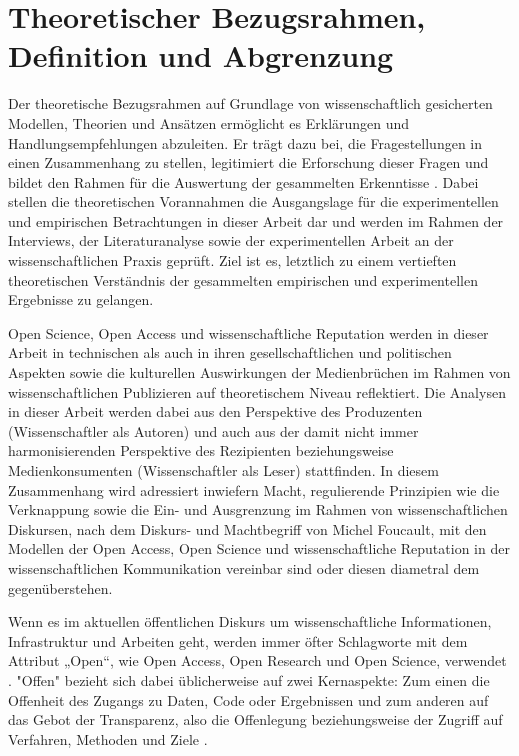 \chapter{Theoretischer Bezugsrahmen, Definition und Abgrenzung } 

Der theoretische Bezugsrahmen auf Grundlage von wissenschaftlich gesicherten Modellen, Theorien und Ansätzen ermöglicht es Erklärungen und Handlungsempfehlungen abzuleiten\cite{martin_2007_wissenschaftstheorie}. Er trägt dazu bei, die Fragestellungen in einen Zusammenhang zu stellen, legitimiert die Erforschung dieser Fragen und bildet den Rahmen für die Auswertung der gesammelten Erkenntisse \cite{suchen}. Dabei stellen die theoretischen Vorannahmen die Ausgangslage für die experimentellen und empirischen Betrachtungen in dieser Arbeit dar und werden im Rahmen der Interviews, der Literaturanalyse sowie der experimentellen Arbeit an der wissenschaftlichen Praxis geprüft. Ziel ist es, letztlich zu einem vertieften theoretischen Verständnis der gesammelten empirischen und experimentellen Ergebnisse zu gelangen. 

Open Science, Open Access und wissenschaftliche Reputation werden in dieser Arbeit in technischen als auch in ihren gesellschaftlichen und politischen Aspekten sowie die kulturellen Auswirkungen der Medienbrüchen im Rahmen von wissenschaftlichen Publizieren auf theoretischem Niveau reflektiert. Die Analysen in dieser Arbeit werden dabei aus den Perspektive des Produzenten (Wissenschaftler als Autoren) und auch aus der damit nicht immer harmonisierenden Perspektive des Rezipienten beziehungsweise Medienkonsumenten (Wissenschaftler als Leser) stattfinden. In diesem Zusammenhang wird adressiert inwiefern Macht, regulierende Prinzipien wie die Verknappung sowie die Ein- und Ausgrenzung im Rahmen von wissenschaftlichen Diskursen, nach dem Diskurs- und Machtbegriff von Michel Foucault, mit den Modellen der Open Access, Open Science und wissenschaftliche Reputation in der wissenschaftlichen Kommunikation vereinbar sind oder diesen diametral dem gegenüberstehen. 

Wenn es im aktuellen öffentlichen Diskurs um wissenschaftliche Informationen, Infrastruktur und Arbeiten geht, werden immer öfter Schlagworte mit dem Attribut „Open“, wie Open Access, Open Research und Open Science, verwendet \cite{bunz_2014} \cite{schulze_2013_open}. "Offen" bezieht sich dabei üblicherweise auf zwei Kernaspekte: Zum einen die Offenheit des Zugangs zu Daten, Code oder Ergebnissen und zum anderen auf das Gebot der Transparenz, also die Offenlegung beziehungsweise der Zugriff auf Verfahren, Methoden und Ziele \cite{schulze_2013_open}.

